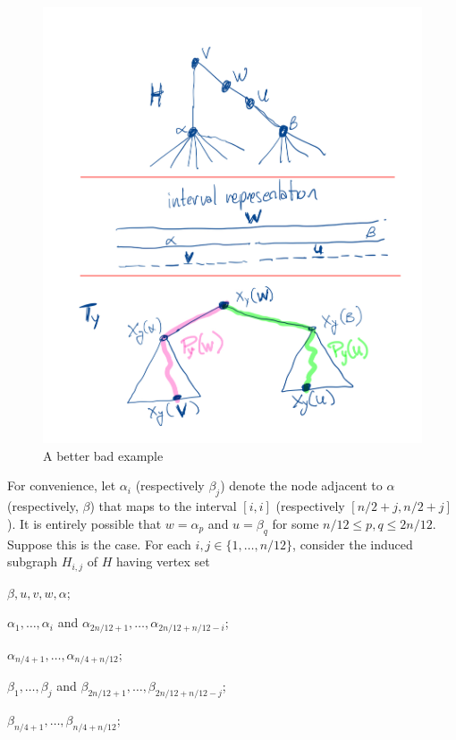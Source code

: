 \documentclass{patmorin}
\begin{document}
\begin{figure}
    \begin{center}
        \includegraphics{figs/bad-example}
    \end{center}
    \caption{A better bad example}
    \label{bad-example}
\end{figure}

For convenience, let $\alpha_i$ (respectively $\beta_j$) denote the node adjacent to $\alpha$ (respectively, $\beta$) that maps to the interval $[i,i]$ (respectively $[n/2+j,n/2+j]$).  It is entirely possible that $w=\alpha_p$ and $u=\beta_q$ for some $n/12\le p,q\le 2n/12$.  Suppose this is the case.  For each $i,j\in\{1,\ldots,n/12\}$, consider the induced subgraph $H_{i,j}$ of $H$ having vertex set
\begin{compactenum}
    \item $\beta,u,v,w,\alpha$;
    \item $\alpha_1,\ldots,\alpha_i$ and $\alpha_{2n/12+1},\ldots,\alpha_{2n/12+n/12-i}$;
    \item $\alpha_{n/4+1},\ldots,\alpha_{n/4+n/12}$;
    \item $\beta_1,\ldots,\beta_j$ and $\beta_{2n/12+1},\ldots,\beta_{2n/12+n/12-j}$;
    \item $\beta_{n/4+1},\ldots,\beta_{n/4+n/12}$;
\end{compactenum}
\end{document}
